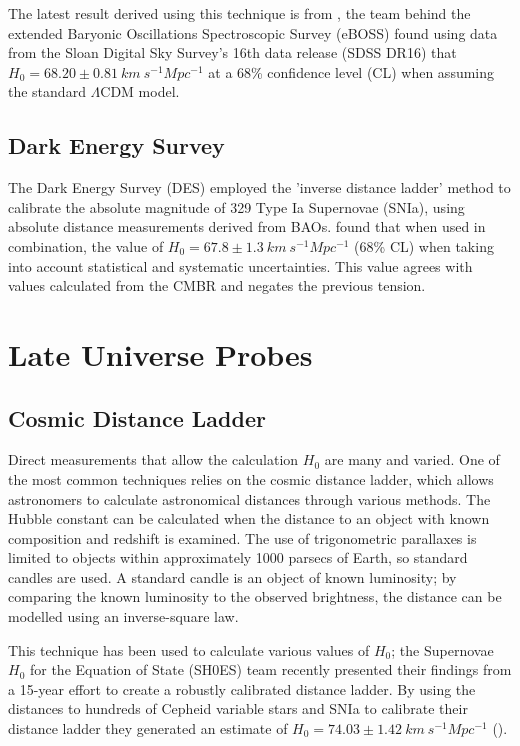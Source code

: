 \documentclass[12pt]{report}
\begin{document}
The latest result derived using this technique is from \textcite{Alam2021}, the team behind the extended Baryonic Oscillations Spectroscopic Survey (eBOSS) found using data from the Sloan Digital Sky Survey's 16th data release (SDSS DR16) that $H_{0} = 68.20 \pm 0.81 \ km \ s^{-1} Mpc^{-1}$ at a 68\% confidence level (CL) when assuming the standard $\Lambda$CDM model. 

\subsection{Dark Energy Survey}

The Dark Energy Survey (DES) employed the 'inverse distance ladder' method to calibrate the absolute magnitude of 329 Type Ia Supernovae (SNIa), using absolute distance measurements derived from BAOs. \textcite{MacAulay2019} found that when used in combination, the value of $H_{0} = 67.8 \pm 1.3 \ km \ s^{-1} Mpc^{-1}$ (68\% CL) when taking into account statistical and systematic uncertainties. This value agrees with values calculated from the CMBR and negates the previous tension. 

\newpage

\section{Late Universe Probes}

\subsection{Cosmic Distance Ladder}

Direct measurements that allow the calculation $H_{0}$ are many and varied. One of the most common techniques relies on the cosmic distance ladder, which allows astronomers to calculate astronomical distances through various methods. The Hubble constant can be calculated when the distance to an object with known composition and redshift is examined. The use of trigonometric parallaxes is limited to objects within approximately 1000 parsecs of Earth, so standard candles are used. A standard candle is an object of known luminosity; by comparing the known luminosity to the observed brightness, the distance can be modelled using an inverse-square law.  

This technique has been used to calculate various values of $H_{0}$; the Supernovae $H_{0}$ for the Equation of State (SH0ES) team recently presented their findings from a 15-year effort to create a robustly calibrated distance ladder. By using the distances to hundreds of Cepheid variable stars and SNIa to calibrate their distance ladder they generated an estimate of $H_{0} = 74.03 \pm 1.42 \ km \ s^{-1} Mpc^{-1} $ (\textcite{Riess2019}).
\end{document}
